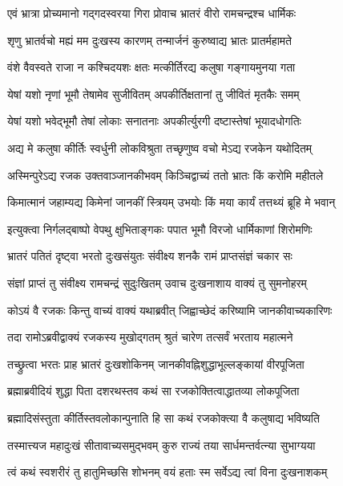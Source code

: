 \twolineshloka
{एवं भ्रात्रा प्रोच्यमानो गद्गदस्वरया गिरा}
{प्रोवाच भ्रातरं वीरो रामचन्द्रश्च धार्मिकः}%

\twolineshloka
{शृणु भ्रातर्वचो मह्यं मम दुःखस्य कारणम्}
{तन्मार्जनं कुरुष्वाद्य भ्रातः प्रातर्महामते}%

\twolineshloka
{वंशे वैवस्वते राजा न कश्चिदयशः क्षतः}
{मत्कीर्तिरद्य कलुषा गङ्गायमुनया गता}%

\twolineshloka
{येषां यशो नृणां भूमौ तेषामेव सुजीवितम्}
{अपकीर्तिक्षतानां तु जीवितं मृतकैः समम्}%

\twolineshloka
{येषां यशो भवेद्भूमौ तेषां लोकाः सनातनाः}
{अपकीर्त्युरगी दष्टास्तेषां भूयादधोगतिः}%

\twolineshloka
{अद्य मे कलुषा कीर्तिः स्वर्धुनी लोकविश्रुता}
{तच्छृणुष्व वचो मेऽद्य रजकेन यथोदितम्}%

\twolineshloka
{अस्मिन्पुरेऽद्य रजक उक्तवाञ्जानकीभवम्}
{किञ्चिद्वाच्यं ततो भ्रातः किं करोमि महीतले}%

\twolineshloka
{किमात्मानं जहाम्यद्य किमेनां जानकीं स्त्रियम्}
{उभयोः किं मया कार्यं तत्तथ्यं ब्रूहि मे भवान्}%

\twolineshloka
{इत्युक्त्वा निर्गलद्बाष्पो वेपथु क्षुभिताङ्गकः}
{पपात भूमौ विरजो धार्मिकाणां शिरोमणिः}%

\twolineshloka
{भ्रातरं पतितं दृष्ट्वा भरतो दुःखसंयुतः}
{संवीक्ष्य शनकै रामं प्राप्तसंज्ञं चकार सः}%

\twolineshloka
{संज्ञां प्राप्तं तु संवीक्ष्य रामचन्द्रं सुदुःखितम्}
{उवाच दुःखनाशाय वाक्यं तु सुमनोहरम्}%

\twolineshloka
{कोऽयं वै रजकः किन्तु वाच्यं वाक्यं यथाब्रवीत्}
{जिह्वाच्छेदं करिष्यामि जानकीवाच्यकारिणः}%

\twolineshloka
{तदा रामोऽब्रवीद्वाक्यं रजकस्य मुखोद्गतम्}
{श्रुतं चारेण तत्सर्वं भरताय महात्मने}%

\twolineshloka
{तच्छ्रुत्वा भरतः प्राह भ्रातरं दुःखशोकिनम्}
{जानकीवह्निशुद्धाभूल्लङ्कायां वीरपूजिता}%

\twolineshloka
{ब्रह्माब्रवीदियं शुद्धा पिता दशरथस्तव}
{कथं सा रजकोक्तित्वाद्धातव्या लोकपूजिता}%

\twolineshloka
{ब्रह्मादिसंस्तुता कीर्तिस्तवलोकान्पुनाति हि}
{सा कथं रजकोक्त्या वै कलुषाद्य भविष्यति}%

\twolineshloka
{तस्मात्त्यज महादुःखं सीतावाच्यसमुद्भवम्}
{कुरु राज्यं तया सार्धमन्तर्वत्न्या सुभाग्यया}%

\twolineshloka
{त्वं कथं स्वशरीरं तु हातुमिच्छसि शोभनम्}
{वयं हताः स्म सर्वेऽद्य त्वां विना दुःखनाशकम्}%

